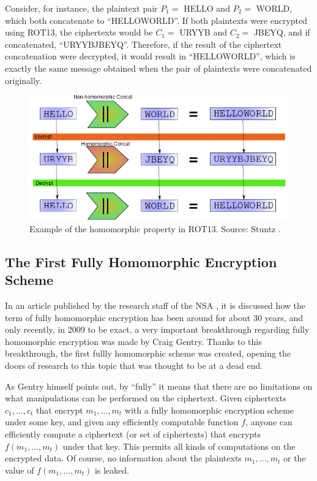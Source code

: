 Consider, for instance, the plaintext pair $P_{1}=$ HELLO and $P_{2}=$ WORLD, which both concatenate to ``HELLOWORLD''. If both plaintexts were encrypted using ROT13, the ciphertexts would be $C_{1}=$ URYYB and $C_{2}=$ JBEYQ, and if concatenated, ``URYYBJBEYQ''. Therefore, if the result of the ciphertext concatenation were decrypted, it would result in ``HELLOWORLD'', which is exactly the same message obtained when the pair of plaintexts were concatenated originally.

\begin{figure}[H]
  \centerline{\includegraphics[scale=0.5]{img/rot13homo}}
  \caption[Example of the homomorphic property in ROT13]{Example of the homomorphic property in ROT13. Source: Stuntz \cite{stuntz2010}.}
\end{figure}

\subsection{The First Fully Homomorphic Encryption Scheme}

In an article published by the research staff of the NSA \cite{NSA2014}, it is discussed how the term of fully homomorphic encryption has been around for about 30 years, and only recently, in 2009 to be exact, a very important breakthrough regarding fully homomorphic encryption was made by Craig Gentry. Thanks to this breakthrough, the first fullly homomorphic scheme was created, opening the doors of research to this topic that was thought to be at a dead end. 

As Gentry \cite{homoenc} himself points out, by ``fully'' it means that there are no limitations on what manipulations can be performed on the ciphertext. Given ciphertexts $c_{1}, \dots, c_{t}$ that encrypt $m_{1}, \dots, m_{t}$ with a fully homomorphic encryption scheme under some key, and given any efficiently computable function $f$, anyone can efficiently compute a ciphertext (or set of ciphertexts) that encrypts $f(m_{1}, \dots, m_{t})$ under that key. This permits all kinds of computations on the encrypted data. Of course, no information about the plaintexts $m_{1}, \dots, m_{t}$ or the value of $f(m_{1}, \dots, m_{t})$ is leaked. 

